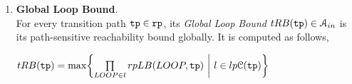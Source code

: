 \begin{enumerate}
\item \textbf{Global Loop Bound}.
\\
For every transition path $\mathtt{tp} \in \mathtt{rp}$, its \emph{Global Loop Bound} $tRB(\mathtt{tp}) \in \mathcal{A}_{in}$ is 
its path-sensitive reachability bound globally. It is computed as follows,
\begin{defn}
 \label{def:global_loop_bound}
$tRB(\tpath) = \max
\left \{ \prod\limits_{LOOP \in l} rpLB(LOOP, \tpath)
~ \middle\vert~ l \in lp\mathcal{C}(\tpath) \right\}$
\end{defn}
\end{enumerate}
